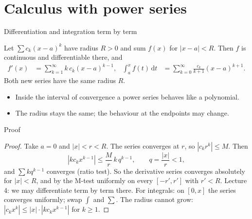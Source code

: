 \documentclass{wosm-slides}
\newcommand{\dt}{\,\mathrm{d}t}
\begin{document}
\section{Calculus with power series}

\begin{frame}{Differentiation and integration term by term}
  \begin{theorem}
    Let $\sum c_k (x - a)^k$ have radius $R > 0$ and sum $f(x)$ for $|x - a| < R$. Then
    $f$ is continuous and differentiable there, and
    \begin{align*}
      f'(x) &= \sum_{k=1}^\infty k\, c_k (x - a)^{k-1}, &
      \int_a^x f(t)\dt &= \sum_{k=0}^\infty \frac{c_k}{k+1} (x - a)^{k+1} .
    \end{align*}
    Both new series have the same radius $R$.
  \end{theorem}
  \pause
  \begin{itemize}
    \item Inside the interval of convergence a power series behaves like a polynomial.
    \item The radius stays the same; the behaviour at the endpoints may change.
  \end{itemize}
\end{frame}

\begin{frame}{Proof}
  \begin{proof}
    Take $a = 0$ and $|x| < r < R$. The series converges at $r$, so $|c_k r^k| \le M$. Then
    \[ |k c_k x^{k-1}| \le \frac{M}{r}\, k\, q^{k-1}, \qquad q = \frac{|x|}{r} < 1 , \]
    and $\sum k q^{k-1}$ converges (ratio test).
    So the derivative series converges absolutely for $|x| < R$, and by the M-test uniformly on
    every $[-r', r']$ with $r' < R$. Lecture 4: we may differentiate term by term there.
    For integrals: on $[0, x]$ the series converges uniformly; swap $\int$ and $\sum$.
    The radius cannot grow: $|c_k x^k| \le |x| \cdot |k c_k x^{k-1}|$ for $k \ge 1$.
  \end{proof}
\end{frame}
\end{document}
